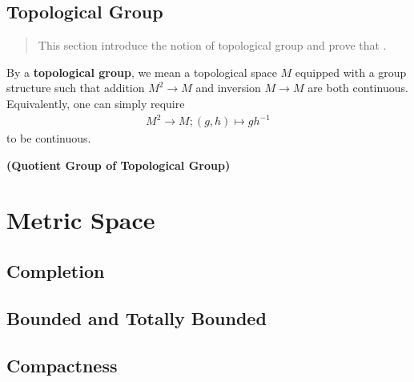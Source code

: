 \documentclass{report}
\begin{document}
\section{Topological Group}
\begin{abstract}
This section introduce the notion of topological group 
and prove that .  
\end{abstract}
\begin{mdframed}
By a \textbf{topological group}, we mean a topological space $M$ equipped with a group structure such that addition $M^2 \rightarrow M$ and inversion $M\rightarrow M$ are both continuous. Equivalently, one can simply require 
\begin{align*}
  M^2\rightarrow M;(g,h)\mapsto gh^{-1}
\end{align*}
to be continuous. 
\end{mdframed}

\begin{theorem}
\label{Quotient Group of Topological Group}
\textbf{(Quotient Group of Topological Group)}
\end{theorem}
\chapter{Metric Space}
\section{Completion}
\section{Bounded and Totally Bounded}
\section{Compactness}
\end{document}
